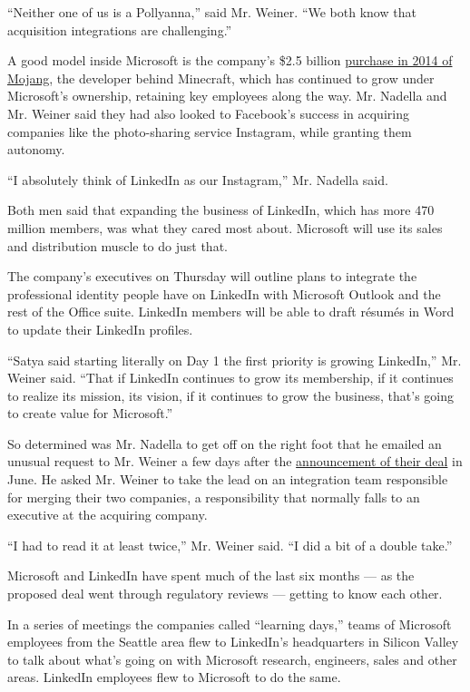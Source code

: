 ``Neither one of us is a Pollyanna,'' said Mr. Weiner. ``We both know
that acquisition integrations are challenging.''

A good model inside Microsoft is the company's \$2.5 billion
\href{http://dealbook.nytimes.com/2014/09/15/microsoft-to-buy-creator-of-minecraft-for-2-5-billion/}{purchase
in 2014 of Mojang}, the developer behind Minecraft, which has continued
to grow under Microsoft's ownership, retaining key employees along the
way. Mr. Nadella and Mr. Weiner said they had also looked to Facebook's
success in acquiring companies like the photo-sharing service Instagram,
while granting them autonomy.

``I absolutely think of LinkedIn as our Instagram,'' Mr. Nadella said.

Both men said that expanding the business of LinkedIn, which has more
470 million members, was what they cared most about. Microsoft will use
its sales and distribution muscle to do just that.

The company's executives on Thursday will outline plans to integrate the
professional identity people have on LinkedIn with Microsoft Outlook and
the rest of the Office suite. LinkedIn members will be able to draft
résumés in Word to update their LinkedIn profiles.

``Satya said starting literally on Day 1 the first priority is growing
LinkedIn,'' Mr. Weiner said. ``That if LinkedIn continues to grow its
membership, if it continues to realize its mission, its vision, if it
continues to grow the business, that's going to create value for
Microsoft.''

So determined was Mr. Nadella to get off on the right foot that he
emailed an unusual request to Mr. Weiner a few days after the
\href{http://www.nytimes.com/2016/06/14/business/dealbook/microsoft-to-buy-linkedin-for-26-2-billion.html}{announcement
of their deal} in June. He asked Mr. Weiner to take the lead on an
integration team responsible for merging their two companies, a
responsibility that normally falls to an executive at the acquiring
company.

``I had to read it at least twice,'' Mr. Weiner said. ``I did a bit of a
double take.''

Microsoft and LinkedIn have spent much of the last six months --- as the
proposed deal went through regulatory reviews --- getting to know each
other.

In a series of meetings the companies called ``learning days,'' teams of
Microsoft employees from the Seattle area flew to LinkedIn's
headquarters in Silicon Valley to talk about what's going on with
Microsoft research, engineers, sales and other areas. LinkedIn employees
flew to Microsoft to do the same.

